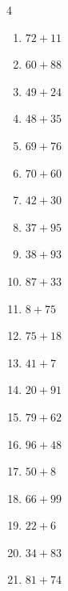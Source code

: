 \begin{multicols}{4}
\begin{enumerate}
  \item $72+11$
        \phantom{$=83$}

\columnbreak %

  \item $60+88$
        \phantom{$=148$}

  \item $49+24$
        \phantom{$=73$}

  \item $48+35$
        \phantom{$=83$}

  \item $69+76$
        \phantom{$=145$}

  \item $70+60$
        \phantom{$=130$}

  \item $42+30$
        \phantom{$=72$}

  \item $37+95$
        \phantom{$=132$}

  \item $38+93$
        \phantom{$=131$}

  \item $87+33$
        \phantom{$=120$}

  \item $8+75$
        \phantom{$=83$}

  \item $75+18$
        \phantom{$=93$}

  \item $41+7$
        \phantom{$=48$}

  \item $20+91$
        \phantom{$=111$}

  \item $79+62$
        \phantom{$=141$}

  \item $96+48$
        \phantom{$=144$}

  \item $50+8$
        \phantom{$=58$}

  \item $66+99$
        \phantom{$=165$}

  \item $22+6$
        \phantom{$=28$}

  \item $34+83$
        \phantom{$=117$}

  \item $81+74$
        \phantom{$=155$}


\end{enumerate}
\end{multicols}
